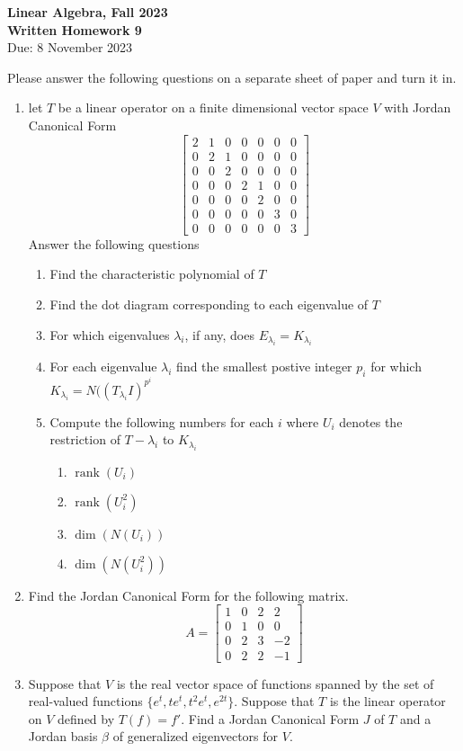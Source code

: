 \documentclass[11 pt]{article}
\DeclareMathOperator\rank{rank}
\begin{document}
\onehalfspacing
\begin{center}
\textbf{{\Large Linear Algebra, Fall 2023}\\
Written Homework 9}\\
Due: 8 November 2023
\end{center}

\noindent Please answer the following questions on a separate sheet of paper and turn it in.

\begin{enumerate}
\item let $T$ be a linear operator on a finite dimensional vector space $V$ with Jordan Canonical Form 
\[\left[ 
\begin{array}{ccc|cc|cc}
2 &1 &0 &0 &0 &0 &0\\
0 &2 &1 &0 &0 &0 &0\\
0 &0 &2 &0 &0 &0 &0\\ \hline
0 &0 &0 &2 &1 &0 &0\\
0 &0 &0 &0 &2 &0 &0\\ \hline
0 &0 &0 &0 &0 &3 &0\\
0 &0 &0 &0 &0 &0 &3
\end{array}
\right]\]
Answer the following questions
    \begin{enumerate}
    \item Find the characteristic polynomial of $T$
    \item Find the dot diagram corresponding to each eigenvalue of $T$
    \item For which eigenvalues $\lambda_i$, if any, does $E_{\lambda_i} = K_{\lambda_i}$
    \item For each eigenvalue $\lambda_i$ find the smallest postive integer $p_i$ for which $K_{\lambda_i} = N((T_{\lambda_i} I)^{p^i}$
    \item Compute the following numbers for each $i$ where $U_i$ denotes the restriction of $T-\lambda_i$ to $K_{\lambda_i}$
        \begin{enumerate}
        \item $\rank(U_i)$
        \item $\rank(U_i^2)$
        \item $\dim(N(U_i))$
        \item $\dim(N(U_i^2))$
        \end{enumerate}
    \end{enumerate}

\item Find the Jordan Canonical Form for the following matrix.
\[A = \begin{bmatrix}
1 &0 &2 &2\\
0 &1 &0 &0\\
0 &2 &3 &-2\\
0 &2 &2 &-1
\end{bmatrix}\]

\item Suppose that $V$ is the real vector space of functions spanned by the set of real-valued functions $\{e^t, te^t, t^2e^t, e^{2t}\}$. Suppose that $T$ is the linear operator on $V$ defined by $T(f) = f'$. Find a Jordan Canonical Form $J$ of $T$ and a Jordan basis $\beta$ of generalized eigenvectors for $V$.

\end{enumerate}
\end{document}
